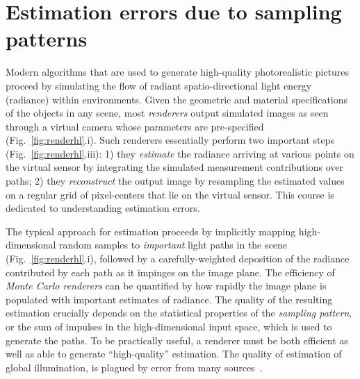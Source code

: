 \documentclass{acmsiggraph}
\begin{document}
%
%


\keywordlist


\printcopyright

\section{Estimation errors due to sampling patterns}
Modern algorithms that are used to generate high-quality photorealistic pictures proceed by simulating the flow of radiant spatio-directional light energy (radiance) within environments. Given the geometric and material specifications of the objects in any scene, most \textit{renderers} output simulated images as seen through a virtual camera whose parameters are pre-specified (Fig.~\ref{fig:renderhl}.i). Such renderers essentially perform two important steps (Fig.~\ref{fig:renderhl}.iii): 1) they \textit{estimate} the radiance arriving at various points on the virtual sensor by integrating the simulated measurement contributions over paths; 2) they \textit{reconstruct} the output image by resampling the estimated values on a regular grid of pixel-centers that lie on the virtual sensor. This course is dedicated to understanding estimation errors.

The typical approach for estimation proceeds by implicitly mapping high-dimensional random samples to \textit{important} light paths in the scene (Fig.~\ref{fig:renderhl}.i), followed by a carefully-weighted deposition of the radiance contributed by each path as it impinges on the image plane. The efficiency of \textit {Monte Carlo renderers} can be quantified by how rapidly the image plane is populated with important estimates of radiance. The quality of the resulting estimation crucially depends on the statistical properties of the \textit {sampling pattern}, or the sum of impulses in the high-dimensional input space, which is used to generate the paths. To be practically useful, a renderer must be both efficient as well as able to generate ``high-quality'' estimation. The quality of estimation of global illumination, is plagued by error from many sources~\cite{arvo1994framework}. 
\end{document}

